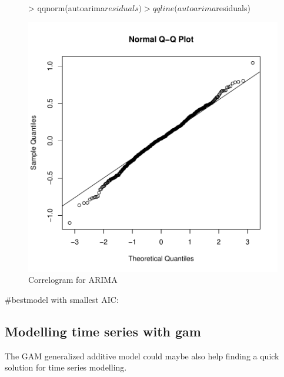 \documentclass[11pt, a4paper]{article} %
\begin{document}
\begin{figure}[H]
\centering
\begin{Schunk}
\begin{Sinput}
> qqnorm(autoarima$residuals)
> qqline(autoarima$residuals)
\end{Sinput}
\end{Schunk}
\includegraphics{alleselena-qqarima}
\caption{Correlogram for ARIMA}
\label{qqarima}
\end{figure}

#bestmodel with smallest AIC: 
\begin{Schunk}
\end{Schunk}

\subsection{Modelling time series with gam}

The GAM generalized additive model could maybe also help finding a quick solution for time series modelling. 
\end{document}
